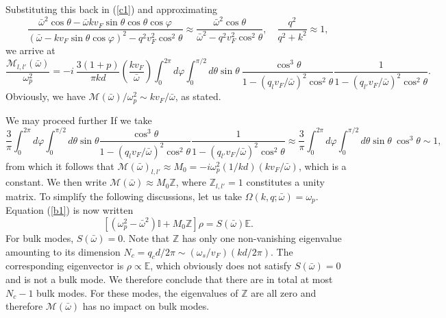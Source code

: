 \documentclass[aps,reprint]{revtex4-1}
\begin{document}
\begin{widetext}
\begin{equation}
\end{equation}
Substituting this back in (\ref{c1}) and approximating
\begin{equation}
\frac{\bar{\omega}^2\cos\theta-\bar{\omega}kv_F\sin\theta\cos\theta\cos\varphi}{(\bar{\omega}-kv_F\sin\theta\cos\varphi)^2-q^2v^2_F\cos^2\theta} \approx \frac{\bar{\omega}^2\cos\theta}{\bar{\omega}^2-q^2v^2_F\cos^2\theta}, \quad \frac{q^2}{q^2+k^2} \approx 1,
\end{equation}
we arrive at 
\begin{equation}
\frac{\mathcal{M}_{l,l'}(\bar{\omega})}{\omega^2_p} = - i ~ \frac{3(1+p)}{\pi kd}\left(\frac{kv_F}{\bar{\omega}}\right)\int^{2\pi}_0d\varphi \int^{\pi/2}_0d\theta \sin\theta~ \frac{\cos^3\theta}{1-(q_{l}v_F/\bar{\omega})^2\cos^2\theta}  \frac{1}{1-(q_{l'}v_F/\bar{\omega})^2\cos^2\theta}. 
\end{equation}
Obviously, we have $\mathcal{M}(\bar{\omega})/\omega^2_p \sim kv_F/\bar{\omega}$, as stated.

We may proceed further If we take
\begin{equation}
\frac{3}{\pi} \int^{2\pi}_0d\varphi \int^{\pi/2}_0d\theta \sin\theta \frac{\cos^3\theta}{1-(q_{l}v_F/\bar{\omega})^2\cos^2\theta}  \frac{1}{1-(q_{l'}v_F/\bar{\omega})^2\cos^2\theta} \approx \frac{3}{\pi} \int^{2\pi}_0d\varphi \int^{\pi/2}_0d\theta \sin\theta ~\cos^3\theta \sim 1,
\end{equation}
from which it follows that $\mathcal{M}(\bar{\omega})_{l,l'} \approx M_0 = -i\omega^2_p(1/kd)(kv_F/\bar{\omega})$, which is a constant. We then write $\mathcal{M}(\bar{\omega}) \approx M_0\mathbb{Z}$, where $\mathbb{Z}_{l,l'}=1$ constitutes a unity matrix. To simplify the following discussions, let us take $\Omega(k,q;\bar{\omega}) = \omega_p$. Equation (\ref{b1}) is now written 
\begin{equation}
\left[(\omega^2_p - \bar{\omega}^2)\mathbb{I}+M_0\mathbb{Z}\right]\rho = S(\bar{\omega}) \mathbb{E}. 
\end{equation}
For bulk modes, $S(\bar{\omega}) = 0$. Note that $\mathbb{Z}$ has only one non-vanishing eigenvalue amounting to its dimension $N_c = q_cd/2\pi \sim (\omega_s/v_F)(kd/2\pi)$. The corresponding eigenvector is $\rho \propto \mathbb{E}$, which obviously does not satisfy $S(\bar{\omega}) = 0$ and is not a bulk mode. We therefore conclude that there are in total at most $N_c-1$ bulk modes. For these modes, the eigenvalues of $\mathbb{Z}$ are all zero and therefore $\mathcal{M}(\bar{\omega})$ has no impact on bulk modes. 


\end{widetext}
\end{document}
